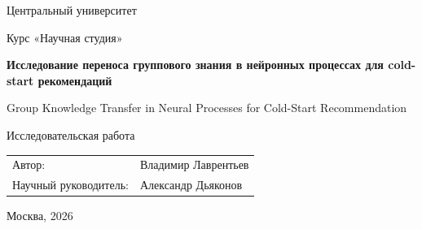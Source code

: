 \documentclass[12pt,a4paper]{article}
\newcommand{\researchtitle}{Исследование переноса группового знания в нейронных процессах для cold-start рекомендаций}
\newcommand{\researchtitleen}{Group Knowledge Transfer in Neural Processes for Cold-Start Recommendation}
\newcommand{\coursename}{Научная студия}
\begin{document}

\begin{titlepage}
    \begin{center}
        \large Центральный университет

        \vspace{0.5cm}
        \large Курс «\coursename»

        \vfill

        \LARGE\textbf{\researchtitle}

        \vspace{0.5cm}
        \large \researchtitleen

        \vspace{1cm}
        \large Исследовательская работа
    \end{center}

    \vfill

    \begin{flushright}
        \begin{tabular}{@{}ll@{}}
            Автор: & Владимир Лаврентьев \\
            Научный руководитель: & Александр Дьяконов
        \end{tabular}
    \end{flushright}

    \vfill

    \begin{center}
        Москва, 2026
    \end{center}
\end{titlepage}

\end{document}
